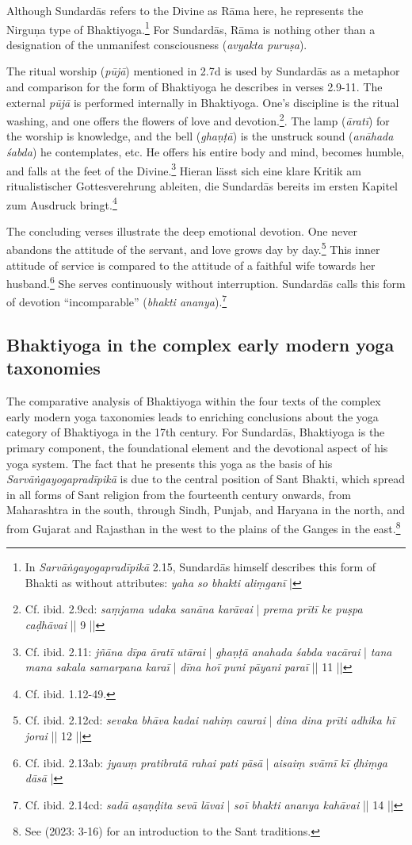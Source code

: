Although Sundardās refers to the Divine as Rāma here, he represents the Nirguṇa type of Bhaktiyoga.\footnote{In \textit{Sarvāṅgayogapradīpikā} 2.15, Sundardās himself describes this form of Bhakti as without attributes: \textit{yaha so bhakti aliṃganī} |} For Sundardās, Rāma is nothing other than a designation of the unmanifest consciousness (\textit{avyakta puruṣa}).

The ritual worship (\textit{pūjā}) mentioned in 2.7d is used by Sundardās as a metaphor and comparison for the form of Bhaktiyoga he describes in verses 2.9-11. The external \textit{pūjā} is performed internally in Bhaktiyoga. One's discipline is the ritual washing, and one offers the flowers of love and devotion.\footnote{Cf. ibid. 2.9cd: \textit{saṃjama udaka sanāna karāvai} | \textit{prema prītī ke puṣpa caḍhāvai} || 9 ||}. The lamp (\textit{āratī}) for the worship is knowledge, and the bell (\textit{ghaṇṭā}) is the unstruck sound (\textit{anāhada śabda}) he contemplates, etc. He offers his entire body and mind, becomes humble, and falls at the feet of the Divine.\footnote{Cf. ibid. 2.11: \textit{jñāna dīpa āratī utārai} | \textit{ghaṇṭā anahada śabda vacārai} | \textit{tana mana sakala samarpana karaī} | \textit{dīna hoī puni pāyani paraī} || 11 ||} Hieran lässt sich eine klare Kritik am ritualistischer Gottesverehrung ableiten, die Sundardās bereits im ersten Kapitel zum Ausdruck bringt.\footnote{Cf. ibid. 1.12-49.}

The concluding verses illustrate the deep emotional devotion. One never abandons the attitude of the servant, and love grows day by day.\footnote{Cf. ibid. 2.12cd: \textit{sevaka bhāva kadai nahiṃ caurai} | \textit{dina dina prīti adhika hī jorai} || 12 ||} This inner attitude of service is compared to the attitude of a faithful wife towards her husband.\footnote{Cf. ibid. 2.13ab: \textit{jyauṃ pratibratā rahai pati pāsā} | \textit{aisaiṃ svāmī kī ḍhiṃga dāsā} |} She serves continuously without interruption. Sundardās calls this form of devotion ``incomparable'' (\textit{bhakti ananya}).\footnote{Cf. ibid. 2.14cd: \textit{sadā aṣaṇḍita sevā lāvai} | \textit{soī bhakti ananya kahāvai} || 14 ||}

\subsection{Bhaktiyoga in the complex early modern yoga taxonomies}

The comparative analysis of Bhaktiyoga within the four texts of the complex early modern yoga taxonomies leads to enriching conclusions about the yoga category of Bhaktiyoga in the 17th century. For Sundardās, Bhaktiyoga is the primary component, the foundational element and the devotional aspect of his yoga system. The fact that he presents this yoga as the basis of his \emph{Sarvāṅgayogapradīpikā} is due to the central position of Sant Bhakti, which spread in all forms of Sant religion from the fourteenth century onwards, from Maharashtra in the south, through Sindh, Punjab, and Haryana in the north, and from Gujarat and Rajasthan in the west to the plains of the Ganges in the east.\footnote{See \citeauthor{horstmann2023shrine} (2023: 3-16) for an introduction to the Sant traditions.}

